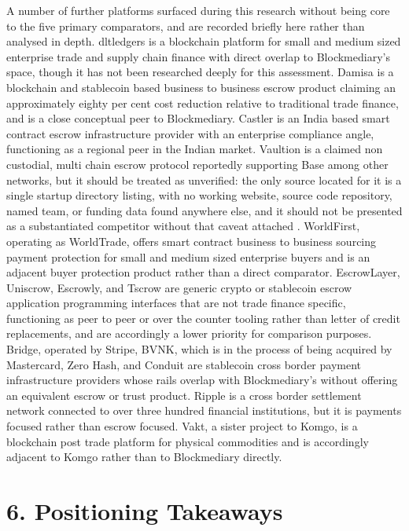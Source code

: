 \documentclass[12pt, a4paper]{article}
\begin{document}
A number of further platforms surfaced during this research without being core to the
five primary comparators, and are recorded briefly here rather than analysed in depth.
dltledgers is a blockchain platform for small and medium sized enterprise trade and supply
chain finance with direct overlap to Blockmediary's space, though it has not been
researched deeply for this assessment. Damisa is a blockchain and stablecoin based
business to business escrow product claiming an approximately eighty per cent cost
reduction relative to traditional trade finance, and is a close conceptual peer to
Blockmediary. Castler is an India based smart contract escrow infrastructure provider with
an enterprise compliance angle, functioning as a regional peer in the Indian market.
Vaultion is a claimed non custodial, multi chain escrow protocol reportedly supporting
Base among other networks, but it should be treated as unverified: the only source located
for it is a single startup directory listing, with no working website, source code
repository, named team, or funding data found anywhere else, and it should not be
presented as a substantiated competitor without that caveat attached
\citep{vaultionlisting}. WorldFirst, operating as WorldTrade, offers smart contract
business to business sourcing payment protection for small and medium sized enterprise
buyers and is an adjacent buyer protection product rather than a direct comparator.
EscrowLayer, Uniscrow, Escrowly, and Tscrow are generic crypto or stablecoin escrow
application programming interfaces that are not trade finance specific, functioning as
peer to peer or over the counter tooling rather than letter of credit replacements, and
are accordingly a lower priority for comparison purposes. Bridge, operated by Stripe,
BVNK, which is in the process of being acquired by Mastercard, Zero Hash, and Conduit are
stablecoin cross border payment infrastructure providers whose rails overlap with
Blockmediary's without offering an equivalent escrow or trust product. Ripple is a cross
border settlement network connected to over three hundred financial institutions, but it
is payments focused rather than escrow focused. Vakt, a sister project to Komgo, is a
blockchain post trade platform for physical commodities and is accordingly adjacent to
Komgo rather than to Blockmediary directly.

\section*{6. Positioning Takeaways}
\end{document}
